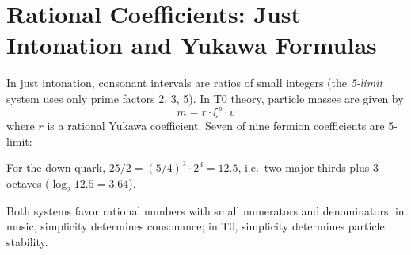 \section{Rational Coefficients: Just Intonation and Yukawa Formulas}

In just intonation, consonant intervals are ratios of small integers (the \emph{5-limit} system uses only prime factors 2, 3, 5). In T0 theory, particle masses are given by
\begin{equation}
	m = r \cdot \xi^p \cdot v
\end{equation}
where $r$ is a rational Yukawa coefficient. Seven of nine fermion coefficients are 5-limit:

\begin{table}[h]
\centering
{}
\caption{Yukawa coefficients and their musical interpretation. The tau coefficient $25/9 = (5/3)^2$ is the square of the major sixth; its octave-reduced form $25/18$ differs from the classical tritone $45/32$ by exactly one syntonic comma $81/80$.}
\label{tab:yukawa-music}
\end{table}
\noindent For the down quark, $25/2 = (5/4)^2 \cdot 2^3 = 12.5$, i.e.\ two major thirds plus 3 octaves ($\log_2 12.5 = 3.64$).

Both systems favor rational numbers with small numerators and denominators: in music, simplicity determines consonance; in T0, simplicity determines particle stability.

